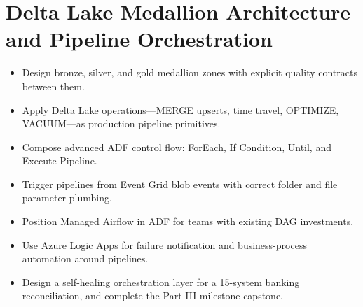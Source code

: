 \chapter{Delta Lake Medallion Architecture and Pipeline Orchestration}
%
\begin{objectives}
\begin{itemize}
    \item Design bronze, silver, and gold medallion zones with explicit quality contracts between them.
    \item Apply Delta Lake operations---MERGE upserts, time travel, OPTIMIZE, VACUUM---as production pipeline primitives.
    \item Compose advanced ADF control flow: ForEach, If Condition, Until, and Execute Pipeline.
    \item Trigger pipelines from Event Grid blob events with correct folder and file parameter plumbing.
    \item Position Managed Airflow in ADF for teams with existing DAG investments.
    \item Use Azure Logic Apps for failure notification and business-process automation around pipelines.
    \item Design a self-healing orchestration layer for a 15-system banking reconciliation, and complete the Part III milestone capstone.
\end{itemize}
\end{objectives}

